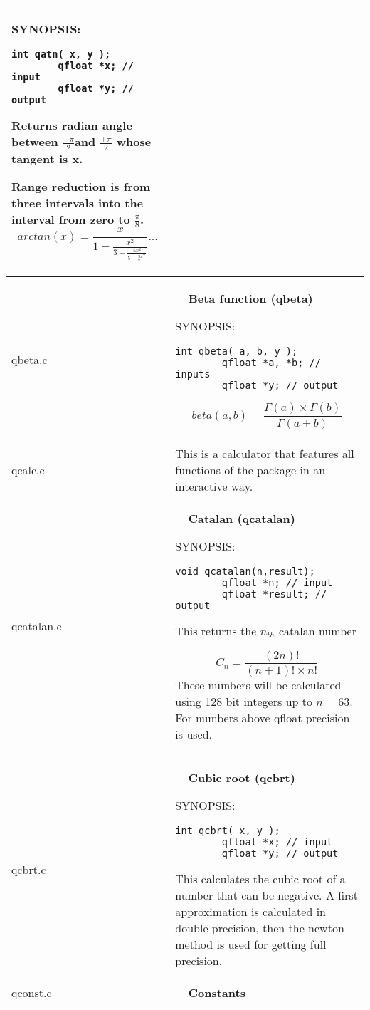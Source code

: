 \documentclass[10pt,a4paper,x11names]{memoir} %
\newcounter{entry}
\newcommand{\TOC}[1] {\addcontentsline{toc}{section}{\theentry\ \  #1} \textbf{\theentry\ \  #1} \par\stepcounter{entry}}
\begin{document}
\begin{longtable}{|p{1.5cm}|p{11.5cm}|}
	{\footnotesize SYNOPSIS:}\vspace{-0.2cm}\index{qatn}
	\begin{lstlisting}[numbers=none]
		int qatn( x, y );
		qfloat *x; // input
		qfloat *y; // output
	\end{lstlisting}\vspace{-0.2cm}
	Returns radian angle between $\frac{-\pi}{2}$and $\frac{+\pi}{2}$ whose tangent is x.
	
	Range reduction is from three intervals into the interval from zero to $\frac{\pi}{8}$.
	$$arctan(x)=\frac{x}{1 - \frac{x^2}{3 - \frac{4x^2}{5 - \frac{9x^2}{7-}}}} ... $$
	
	\\\hline
	qbeta.c &\TOC{Beta function (qbeta)}
	{\footnotesize SYNOPSIS:}\vspace{-0.2cm}\index{qbeta}
	\begin{lstlisting}[numbers=none]
		int qbeta( a, b, y );
		qfloat *a, *b; // inputs
		qfloat *y; // output
	\end{lstlisting}\vspace{-0.2cm}
	
	$$ beta(a,b) = \frac{\Gamma (a) \times \Gamma (b)}{\Gamma (a+b)}$$
	\\\hline
	qcalc.c& \index{qcalc }This is a calculator that features all functions of the package in an interactive way.\\\hline
	qcatalan.c& \TOC{Catalan (qcatalan)}
	{\footnotesize SYNOPSIS:}\vspace{-0.2cm}\index{qcatalan}
	\begin{lstlisting}[numbers=none]
		void qcatalan(n,result);
		qfloat *n; // input
		qfloat *result; // output
	\end{lstlisting}\vspace{-0.2cm}
	This returns the $n_{th}$ catalan number
	
	$$C_n=\frac{(2n)!}{(n+1)!\times n!}$$ These  numbers will be calculated using 128 bit integers up to $n=63$. For numbers above qfloat precision is used.
	\\\hline
	qcbrt.c& \TOC{Cubic root (qcbrt)}
	{\footnotesize SYNOPSIS:}\vspace{-0.2cm}\index{qcbrt}
	\begin{lstlisting}[numbers=none]
		int qcbrt( x, y );
		qfloat *x; // input
		qfloat *y; // output
	\end{lstlisting}\vspace{-0.2cm}
	This calculates the cubic root of a number that can be negative. A first approximation is calculated in double precision, then  the newton method is used for getting full precision.
	\\\hline 
	qconst.c& \TOC{Constants}
	

\end{longtable}
\end{document}

